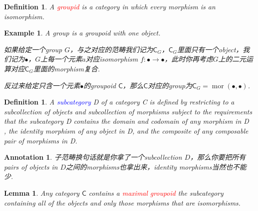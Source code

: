 \documentclass{article}
\newtheorem{lemma}[theorem]{Lemma}
\newtheorem{example}[theorem]{Example}
\newtheorem{definition}[theorem]{Definition}
\newtheorem{annotation}[theorem]{Annotation}
\newcommand*{\cat}[1]{\textsf{#1}\xspace}
\newcommand*{\xfunc}[4]{{#2}\colon{#3}{#1}{#4}}
\newcommand*{\func}[3]{\xfunc{\to}{#1}{#2}{#3}}
\DeclareMathOperator{\mor}{mor}
\newcommand{\redt}[1]{\textcolor{red}{#1}}
\newcommand{\bluet}[1]{\textcolor{blue}{#1}}
\begin{document}
\begin{definition}
\rm A \redt{groupid} is a category in which every morphism  is an isomorphism. 
\end{definition}

\begin{example}
\rm A group is a groupoid with one object. 

如果给定一个group $G$，与之对应的范畴我们记为$\cat{C}_G$，$\cat{C}_G$里面只有一个object，我们记为$\bullet$，$G$上每一个元素$a$对应isomorphism $\func{f}{\bullet}{\bullet}$，此时你再考虑$G$上的二元运算对应$\cat{C}_G$里面的morphism复合. 

反过来给定只含一个元素$\bullet$的groupoid $\cat{C}$，那么$\cat{C}$对应的group为$\cat{C}_G = \mor(\bullet,\bullet)$. 
\end{example}



\begin{definition}
\rm A \bluet{subcategory} D of a category C is defined by restricting to a subcollection of objects and subcollection of morphisms subject to the requirements that the subcategory D contains
the domain and codomain of any morphism in D , the identity morphism of any object in D, and the composite of any composable pair of morphisms in D.
\end{definition}

\begin{annotation}
\rm 子范畴换句话就是你拿了一个subcollection $D$，那么你要把所有pairs of objects in $D$之间的morphisms也拿出来，identity morphisms当然也不能少. 
\end{annotation}

\begin{lemma}
\rm Any category $\cat{C}$ contains a \redt{maximal groupoid} the subcategory containing all of the objects and only those morphisms that are isomorphisms. 
\end{lemma}
\end{document}
